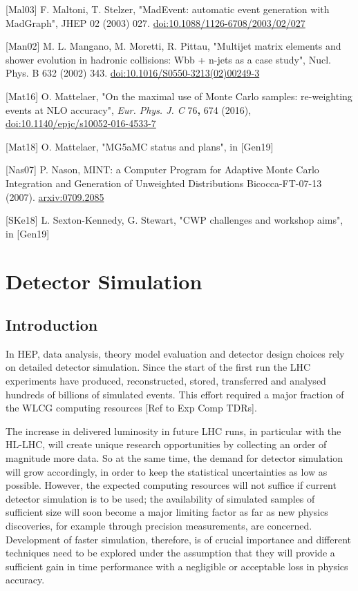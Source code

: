 \documentclass[10pt,a4paper]{article}
\begin{document}
{[}Mal03{]} F. Maltoni, T. Stelzer, "MadEvent: automatic event
generation with MadGraph", JHEP 02 (2003) 027.
\href{https://doi.org/10.1088/1126-6708/2003/02/027}{{doi:10.1088/1126-6708/2003/02/027}}

{[}Man02{]} M. L. Mangano, M. Moretti, R. Pittau, "Multijet matrix
elements and shower evolution in hadronic collisions: Wbb + n-jets as a
case study", Nucl. Phys. B 632 (2002) 343.
\href{https://doi.org/10.1016/S0550-3213(02)00249-3}{{doi:10.1016/S0550-3213(02)00249-3}}

{[}Mat16{]} O. Mattelaer, "On the maximal use of Monte Carlo samples:
re-weighting events at NLO accuracy", \emph{Eur. Phys. J. C}
76\textbf{,} 674 (2016),
\href{https://doi.org/10.1140/epjc/s10052-016-4533-7}{{doi:10.1140/epjc/s10052-016-4533-7}}

{[}Mat18{]} O. Mattelaer, "MG5aMC status and plans", in {[}Gen19{]}

{[}Nas07{]} P. Nason, MINT: a Computer Program for Adaptive Monte Carlo
Integration and Generation of Unweighted Distributions Bicocca-FT-07-13
(2007). \href{https://arxiv.org/abs/0709.2085}{{arxiv:0709.2085}}

{[}SKe18{]} L. Sexton-Kennedy, G. Stewart, "CWP challenges and workshop
aims", in {[}Gen19{]}

\hypertarget{detector-simulation}{%
\section{Detector Simulation}\label{detector-simulation}}

\hypertarget{introduction-2}{%
\subsection{Introduction}\label{introduction-2}}

In HEP, data analysis, theory model evaluation and detector design
choices rely on detailed detector simulation. Since the start of the
first run the LHC experiments have produced, reconstructed, stored,
transferred and analysed hundreds of billions of simulated events. This
effort required a major fraction of the WLCG computing resources {[}Ref
to Exp Comp TDRs{]}.

The increase in delivered luminosity in future LHC runs, in particular
with the HL-LHC, will create unique research opportunities by collecting
an order of magnitude more data. So at the same time, the demand for
detector simulation will grow accordingly, in order to keep the
statistical uncertainties as low as possible. However, the expected
computing resources will not suffice if current detector simulation is
to be used; the availability of simulated samples of sufficient size
will soon become a major limiting factor as far as new physics
discoveries, for example through precision measurements, are concerned.
Development of faster simulation, therefore, is of crucial importance
and different techniques need to be explored under the assumption that
they will provide a sufficient gain in time performance with a
negligible or acceptable loss in physics accuracy.
\end{document}
